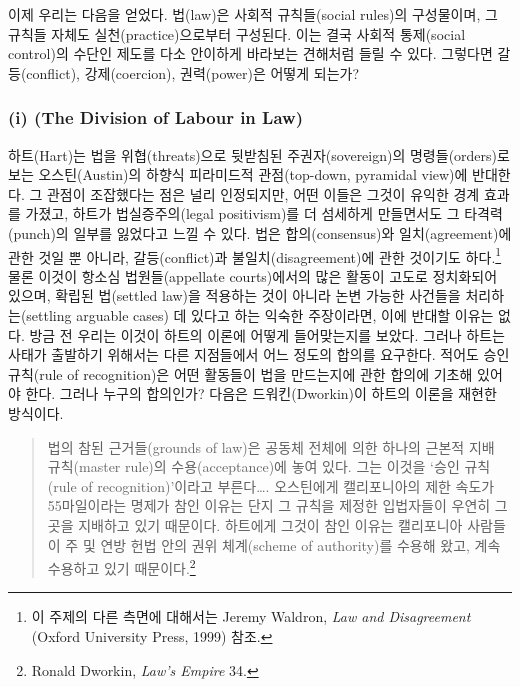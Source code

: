 이제 우리는 다음을 얻었다. 법(law)은 사회적 규칙들(social rules)의
구성물이며, 그 규칙들 자체도 실천(practice)으로부터 구성된다. 이는 결국
사회적 통제(social control)의 수단인 제도를 다소 안이하게 바라보는
견해처럼 들릴 수 있다. 그렇다면 갈등(conflict), 강제(coercion),
권력(power)은 어떻게 되는가?

\subsubsection{\texorpdfstring{(i)  (The Division of
Labour in
Law)}{(i) 법에서의 분업 (The Division of Labour in Law)}}\label{i-uxbc95uxc5d0uxc11cuxc758-uxbd84uxc5c5-the-division-of-labour-in-law}

하트(Hart)는 법을 위협(threats)으로 뒷받침된 주권자(sovereign)의
명령들(orders)로 보는 오스틴(Austin)의 하향식 피라미드적 관점(top-down,
pyramidal view)에 반대한다. 그 관점이 조잡했다는 점은 널리 인정되지만,
어떤 이들은 그것이 유익한 경계 효과를 가졌고, 하트가 법실증주의(legal
positivism)를 더 섬세하게 만들면서도 그 타격력(punch)의 일부를 잃었다고
느낄 수 있다. 법은 합의(consensus)와 일치(agreement)에 관한 것일 뿐
아니라, 갈등(conflict)과 불일치(disagreement)에 관한 것이기도
하다.\footnote{이 주제의 다른 측면에 대해서는 Jeremy Waldron, \emph{Law
  and Disagreement} (Oxford University Press, 1999) 참조.} 물론 이것이
항소심 법원들(appellate courts)에서의 많은 활동이 고도로 정치화되어
있으며, 확립된 법(settled law)을 적용하는 것이 아니라 논변 가능한
사건들을 처리하는(settling arguable cases) 데 있다고 하는 익숙한
주장이라면, 이에 반대할 이유는 없다. 방금 전 우리는 이것이 하트의 이론에
어떻게 들어맞는지를 보았다. 그러나 하트는 사태가 출발하기 위해서는 다른
지점들에서 어느 정도의 합의를 요구한다. 적어도 승인 규칙(rule of
recognition)은 어떤 활동들이 법을 만드는지에 관한 합의에 기초해 있어야
한다. 그러나 누구의 합의인가? 다음은 드워킨(Dworkin)이 하트의 이론을
재현한 방식이다.

\begin{quote}
법의 참된 근거들(grounds of law)은 공동체 전체에 의한 하나의 근본적 지배
규칙(master rule)의 수용(acceptance)에 놓여 있다. 그는 이것을 ‘승인
규칙(rule of recognition)’이라고 부른다\ldots. 오스틴에게 캘리포니아의
제한 속도가 55마일이라는 명제가 참인 이유는 단지 그 규칙을 제정한
입법자들이 우연히 그곳을 지배하고 있기 때문이다. 하트에게 그것이 참인
이유는 캘리포니아 사람들이 주 및 연방 헌법 안의 권위 체계(scheme of
authority)를 수용해 왔고, 계속 수용하고 있기 때문이다.\footnote{Ronald
  Dworkin, \emph{Law's Empire} 34.}
\end{quote}

